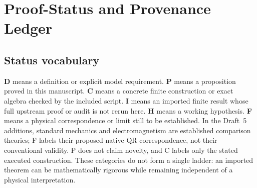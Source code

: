 \section{Proof-Status and Provenance Ledger}
\label{app:status}
\subsection{Status vocabulary}
\textbf{D} means a definition or explicit model requirement. \textbf{P} means a proposition proved in this manuscript. \textbf{C} means a concrete finite construction or exact algebra checked by the included script. \textbf{I} means an imported finite result whose full upstream proof or audit is not rerun here. \textbf{H} means a working hypothesis. \textbf{F} means a physical correspondence or limit still to be established. In the Draft~5 additions, standard mechanics and electromagnetism are established comparison theories; F labels their proposed native QR correspondence, not their conventional validity. P does not claim novelty, and C labels only the stated executed construction. These categories do not form a single ladder: an imported theorem can be mathematically rigorous while remaining independent of a physical interpretation.

